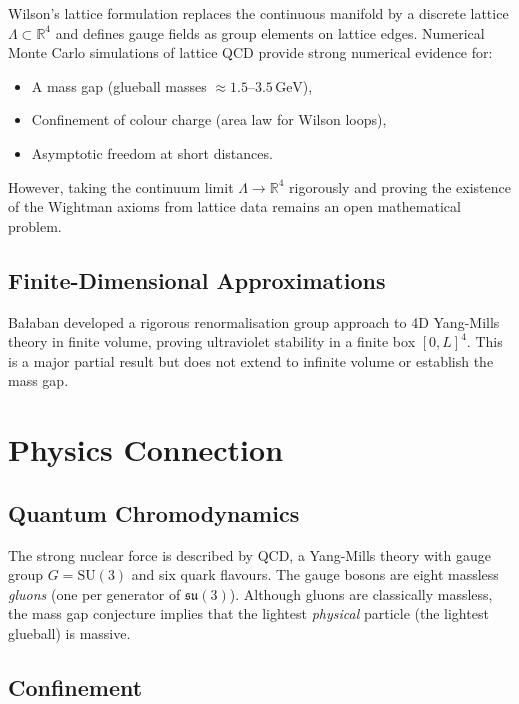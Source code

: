 \documentclass[12pt,a4paper]{amsart}
\theoremstyle{definition}
\theoremstyle{remark}
\begin{document}
Wilson's lattice formulation \cite{Wilson1974} replaces the continuous manifold by a
discrete lattice $\Lambda \subset \mathbb{R}^4$ and defines gauge fields as group
elements on lattice edges. Numerical Monte Carlo simulations of lattice QCD provide
strong numerical evidence for:
\begin{itemize}[noitemsep]
  \item A mass gap (glueball masses $\approx 1.5$--$3.5 \,\mathrm{GeV}$),
  \item Confinement of colour charge (area law for Wilson loops),
  \item Asymptotic freedom at short distances.
\end{itemize}
However, taking the continuum limit $\Lambda \to \mathbb{R}^4$ rigorously and proving
the existence of the Wightman axioms from lattice data remains an open mathematical problem.

\subsection{Finite-Dimensional Approximations}

Bałaban \cite{Balaban1985} developed a rigorous renormalisation group approach to
4D Yang-Mills theory in finite volume, proving ultraviolet stability in a finite box
$[0,L]^4$. This is a major partial result but does not extend to infinite volume or
establish the mass gap.

\section{Physics Connection}
\label{sec:physics}

\subsection{Quantum Chromodynamics}

The strong nuclear force is described by QCD, a Yang-Mills theory with gauge group
$G = \mathrm{SU}(3)$ and six quark flavours. The gauge bosons are eight massless
\emph{gluons} (one per generator of $\mathfrak{su}(3)$). Although gluons are classically
massless, the mass gap conjecture implies that the lightest \emph{physical} particle
(the lightest glueball) is massive.

\subsection{Confinement}
\end{document}
